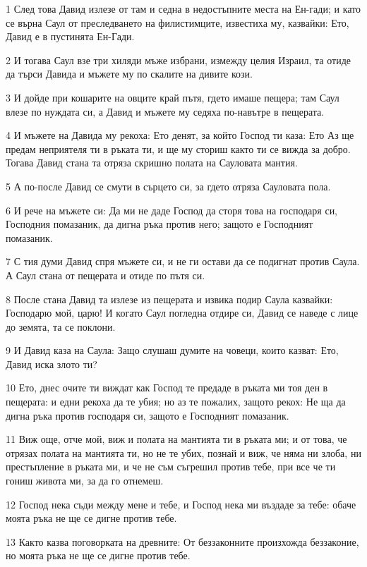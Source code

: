\par 1 След това Давид излезе от там и седна в недостъпните места на Ен-гади; и като се върна Саул от преследването на филистимците, известиха му, казвайки: Ето, Давид е в пустинята Ен-Гади.
\par 2 И тогава Саул взе три хиляди мъже избрани, измежду целия Израил, та отиде да търси Давида и мъжете му по скалите на дивите кози.
\par 3 И дойде при кошарите на овците край пътя, гдето имаше пещера; там Саул влезе по нуждата си, а Давид и мъжете му седяха по-навътре в пещерата.
\par 4 И мъжете на Давида му рекоха: Ето денят, за който Господ ти каза: Ето Аз ще предам неприятеля ти в ръката ти, и ще му сториш както ти се вижда за добро. Тогава Давид стана та отряза скришно полата на Сауловата мантия.
\par 5 А по-после Давид се смути в сърцето си, за гдето отряза Сауловата пола.
\par 6 И рече на мъжете си: Да ми не даде Господ да сторя това на господаря си, Господния помазаник, да дигна ръка против него; защото е Господният помазаник.
\par 7 С тия думи Давид спря мъжете си, и не ги остави да се подигнат против Саула. А Саул стана от пещерата и отиде по пътя си.
\par 8 После стана Давид та излезе из пещерата и извика подир Саула казвайки: Господарю мой, царю! И когато Саул погледна отдире си, Давид се наведе с лице до земята, та се поклони.
\par 9 И Давид каза на Саула: Защо слушаш думите на човеци, които казват: Ето, Давид иска злото ти?
\par 10 Ето, днес очите ти виждат как Господ те предаде в ръката ми тоя ден в пещерата: и едни рекоха да те убия; но аз те пожалих, защото рекох: Не ща да дигна ръка против господаря си, защото е Господният помазаник.
\par 11 Виж още, отче мой, виж и полата на мантията ти в ръката ми; и от това, че отрязах полата на мантията ти, но не те убих, познай и виж, че няма ни злоба, ни престъпление в ръката ми, и че не съм съгрешил против тебе, при все че ти гониш живота ми, за да го отнемеш.
\par 12 Господ нека съди между мене и тебе, и Господ нека ми въздаде за тебе: обаче моята ръка не ще се дигне против тебе.
\par 13 Както казва поговорката на древните: От беззаконните произхожда беззаконие, но моята ръка не ще се дигне против тебе.
